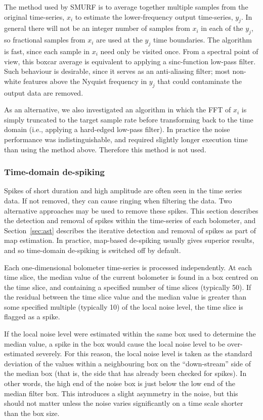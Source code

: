 \documentclass[useAMS,usenatbib,nofootinbib]{mn2e}
\begin{document}
The method used by SMURF is to average together multiple samples from
the original time-series, $x_i$ to estimate the lower-frequency output
time-series, $y_j$. In general there will not be an integer number of
samples from $x_i$ in each of the $y_j$, so fractional samples from
$x_i$ are used at the $y_j$ time boundaries. The algorithm is fast,
since each sample in $x_i$ need only be visited once. From a spectral
point of view, this boxcar average is equivalent to applying a
sinc-function low-pass filter. Such behaviour is desirable, since it
serves as an anti-aliasing filter; most non-white features above the
Nyquist frequency in $y_j$ that could contaminate the output data are
removed.

As an alternative, we also investigated an algorithm in which the FFT
of $x_i$ is simply truncated to the target sample rate before
transforming back to the time domain (i.e., applying a hard-edged
low-pass filter). In practice the noise performance was
indistinguishable, and required slightly longer execution time than using
the method above. Therefore this method is not used.

\subsubsection{Time-domain de-spiking}
\label{sec:timedespike}

Spikes of short duration and high amplitude are often seen in the time
series data. If not removed, they can cause ringing when filtering the
data. Two alternative approaches may be used to remove these
spikes. This section describes the detection and removal of spikes
within the time-series of each bolometer, and Section~\ref{sec:ast}
describes the iterative detection and removal of spikes as part of map
estimation. In practice, map-based de-spiking usually gives superior
results, and so time-domain de-spiking is switched off by default.

Each one-dimensional bolometer time-series is processed
independently. At each time slice, the median value of the current
bolometer is found in a box centred on the time slice, and containing
a specified number of time slices (typically 50). If the residual
between the time slice value and the median value is greater than some
specified multiple (typically 10) of the local noise level, the time
slice is flagged as a spike.

If the local noise level were estimated within the same box used to
determine the median value, a spike in the box would cause the local
noise level to be over-estimated severely. For this reason, the local
noise level is taken as the standard deviation of the values within a
neighbouring box on the ``down-stream'' side of the median box (that
is, the side that has already been checked for spikes). In other
words, the high end of the noise box is just below the low end of the
median filter box. This introduces a slight asymmetry in the noise,
but this should not matter unless the noise varies significantly on a
time scale shorter than the box size.
\end{document}
